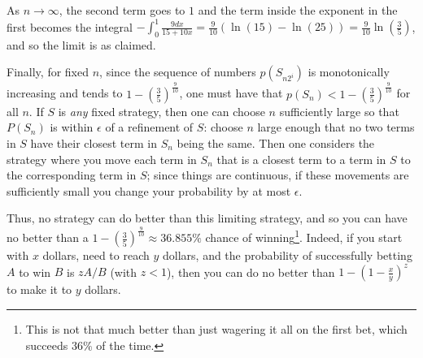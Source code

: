 \documentclass[11pt]{article}
\theoremstyle{definition}
\begin{document}
As $n \rightarrow \infty$, the second term goes to $1$ and the term inside the exponent in the first becomes the integral $\displaystyle{-\int_{0}^1 \frac{9dx}{15+10x} = \frac{9}{10}(\ln(15)-\ln(25)) = \frac{9}{10}\ln\left(\frac{3}{5}\right)}$, and so the limit is as claimed.

Finally, for fixed $n$, since the sequence of numbers $p(S_{n2^i})$ is monotonically increasing and tends to $\displaystyle{1-\left(\frac{3}{5}\right)^{\frac{9}{10}}}$, one must have that $\displaystyle{p(S_n) <  1-\left(\frac{3}{5}\right)^{\frac{9}{10}}}$ for all $n$.  If $S$ is \emph{any} fixed strategy, then one can choose $n$ sufficiently large so that $P(S_n)$ is within $\epsilon$ of a refinement of $S$: choose $n$ large enough that no two terms in $S$ have their closest term in $S_n$ being the same.  Then one considers the strategy where you move each term in $S_n$ that is a closest term to a term in $S$ to the corresponding term in $S$; since things are continuous, if these movements are sufficiently small you change your probability by at most $\epsilon$.

Thus, no strategy can do better than this limiting strategy, and so you can have no better than a $\displaystyle{1 - \left(\frac{3}{5}\right)^{\frac{9}{10}}} \approx 36.855\%$ chance of winning\footnote{This is not that much better than just wagering it all on the first bet, which succeeds $36\%$ of the time.}.  Indeed, if you start with $x$ dollars, need to reach $y$ dollars, and the probability of successfully betting $A$ to win $B$ is $zA/B$ (with $z<1$), then you can do no better than $\displaystyle{1-\left(1-\frac{x}{y}\right)^z}$ to make it to $y$ dollars.
\end{document}
